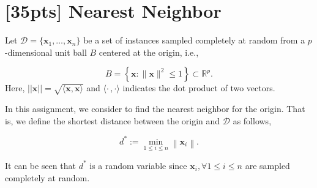 \documentclass{article}
\begin{document}
	
	\section{[35pts] {Nearest Neighbor}}
	
	Let $\mathcal{D} = \{\mathbf{x}_1, \dots, \mathbf{x}_n\}$ be a set of instances sampled completely at random from a $p$-dimensional unit ball $B$ centered at the origin, i.e.,
	
\begin{equation}
B=\left\{\mathbf{x} :\|\mathbf{x}\|^{2} \leq 1\right\} \subset \mathbb{R}^{p}.
\end{equation}
Here, $||\mathbf{x}|| = \sqrt{\langle \mathbf{x}, \mathbf{x}\rangle}$ and $\langle \cdot \,, \cdot \rangle$ indicates the dot product of two vectors.
	
In this assignment, we consider to find the nearest neighbor for the origin. That is, we define the shortest distance between the origin and $\mathcal{D}$ as follows,

\begin{equation}
d^{*} :=\min _{1 \leq i \leq n}\left\|\mathbf{x}_{i}\right\|.
\end{equation}
	
It can be seen that $d^*$ is a random variable since $\mathbf{x}_i, \forall 1 \leq i \leq n$ are sampled completely at random.	
	
\end{document}
